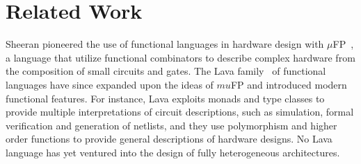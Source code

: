 \documentclass[../paper.tex]{subfiles}
\begin{document}
\chapter{Related Work}
\label{related}



Sheeran pioneered the use of functional languages in hardware design with $\mu$FP~\cite{sheeran1984}, a language that utilize functional combinators to describe complex hardware from the composition of small circuits and gates. The Lava family~\cite{bjesse1998, gill2010, york-lava} of functional languages have since expanded upon the ideas of $mu$FP and introduced modern functional features. For instance, Lava exploits monads and type classes to provide multiple interpretations of circuit descriptions, such as simulation, formal verification and generation of netlists, and they use polymorphism and higher order functions to provide general descriptions of hardware designs. No Lava language has yet ventured into the design of fully heterogeneous architectures.

\end{document}
